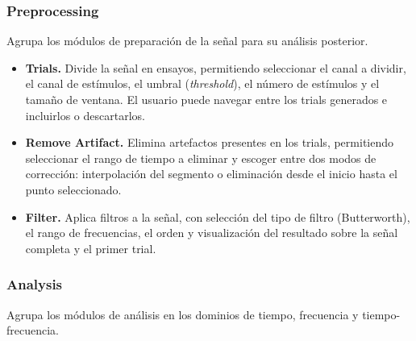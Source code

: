 \documentclass[12pt, letterpaper]{article}
\begin{document}
\subsubsection{Preprocessing}

Agrupa los módulos de preparación de la señal para su análisis posterior.

\begin{itemize}

    \item \textbf{Trials.} Divide la señal en ensayos, permitiendo
    seleccionar el canal a dividir, el canal de estímulos, el umbral
    (\textit{threshold}), el número de estímulos y el tamaño de ventana. El
    usuario puede navegar entre los trials generados e incluirlos o
    descartarlos.

    \item \textbf{Remove Artifact.} Elimina artefactos presentes en los
    trials, permitiendo seleccionar el rango de tiempo a eliminar y escoger
    entre dos modos de corrección: interpolación del segmento o eliminación
    desde el inicio hasta el punto seleccionado.

    \item \textbf{Filter.} Aplica filtros a la señal, con selección del tipo
    de filtro (Butterworth), el rango de frecuencias, el orden y
    visualización del resultado sobre la señal completa y el primer trial.

\end{itemize}

\subsubsection{Analysis}

Agrupa los módulos de análisis en los dominios de tiempo, frecuencia y
tiempo-frecuencia.
\end{document}
